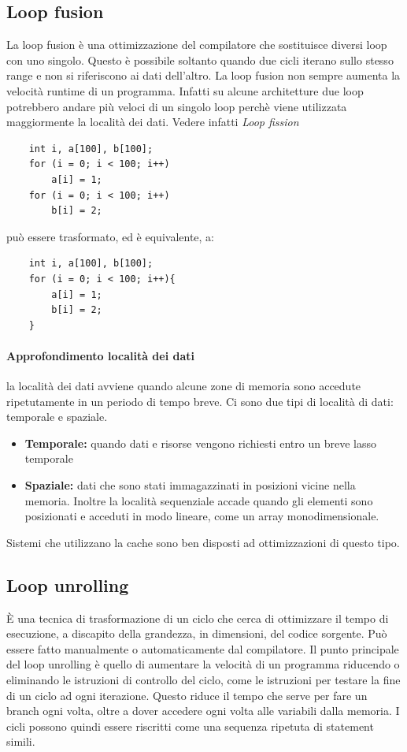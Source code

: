 \documentclass[a4paper, 11pt,            %
openright,               %
italian,
english                 
]{article}       %
\begin{document}
	
	
	
	\subsection{Loop fusion}
	
	La loop fusion è una ottimizzazione del compilatore che sostituisce diversi loop con uno singolo. Questo è possibile soltanto quando due cicli iterano sullo stesso range e non si riferiscono ai dati dell'altro. La loop fusion non sempre aumenta la velocità runtime di un programma. Infatti su alcune architetture due loop potrebbero andare più veloci di un singolo loop perchè viene utilizzata maggiormente la località dei dati. Vedere infatti \textit{Loop fission}
	
	\begin{lstlisting}
	int i, a[100], b[100];
	for (i = 0; i < 100; i++)
		a[i] = 1;                     
	for (i = 0; i < 100; i++)
		b[i] = 2;
	\end{lstlisting}
	
	può essere trasformato, ed è equivalente, a:
	
	\begin{lstlisting}
  	int i, a[100], b[100];
	for (i = 0; i < 100; i++){
		a[i] = 1; 
		b[i] = 2;
	}
	\end{lstlisting}
	
	\paragraph{Approfondimento località dei dati} la località dei dati avviene quando alcune zone di memoria sono accedute ripetutamente in un periodo di tempo breve. Ci sono due tipi di località di dati: temporale e spaziale. 
	\begin{itemize}
		\item \textbf{Temporale:} quando dati e risorse vengono richiesti entro un breve lasso temporale
		\item \textbf{Spaziale:} dati che sono stati immagazzinati in posizioni vicine nella memoria. Inoltre la località sequenziale accade quando gli elementi sono posizionati e acceduti in modo lineare, come un array monodimensionale.
	\end{itemize}
	Sistemi che utilizzano la cache sono ben disposti ad ottimizzazioni di questo tipo. 


	\subsection{Loop unrolling}
	È una tecnica di trasformazione di un ciclo che cerca di ottimizzare il tempo di esecuzione, a discapito della grandezza, in dimensioni, del codice sorgente. Può essere fatto manualmente o automaticamente dal compilatore. Il punto principale del loop unrolling è quello di aumentare la velocità di un programma riducendo o eliminando le istruzioni di controllo del ciclo, come le istruzioni per testare la fine di un ciclo ad ogni iterazione. Questo riduce il tempo che serve per fare un branch ogni volta, oltre a dover accedere ogni volta alle variabili dalla memoria. I cicli possono quindi essere riscritti come una sequenza ripetuta di statement simili. 
	
\end{document}
